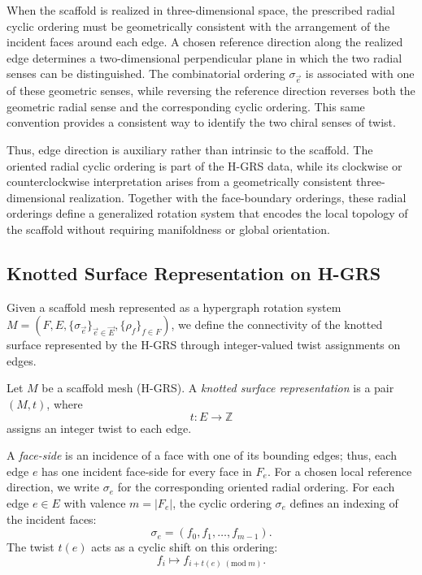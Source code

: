 \documentclass[acmtog]{acmart}
\begin{document}

When the scaffold is realized in three-dimensional space, the prescribed radial cyclic ordering must be geometrically consistent with the arrangement of the incident faces around each edge. A chosen reference direction along the realized edge determines a two-dimensional perpendicular plane in which the two radial senses can be distinguished. The combinatorial ordering $\sigma_{\vec{e}}$ is associated with one of these geometric senses, while reversing the reference direction reverses both the geometric radial sense and the corresponding cyclic ordering. This same convention provides a consistent way to identify the two chiral senses of twist.

Thus, edge direction is auxiliary rather than intrinsic to the scaffold. The oriented radial cyclic ordering is part of the H-GRS data, while its clockwise or counterclockwise interpretation arises from a geometrically consistent three-dimensional realization. Together with the face-boundary orderings, these radial orderings define a generalized rotation system that encodes the local topology of the scaffold without requiring manifoldness or global orientation.

\subsection{Knotted Surface Representation on H-GRS}

Given a scaffold mesh represented as a hypergraph rotation system
$M = (F,E,\{\sigma_{\vec e}\}_{\vec e\in \vec E},\{\rho_f\}_{f\in F})$, we define the connectivity of the knotted surface represented by the H-GRS through integer-valued twist assignments on edges.

\begin{definition}
Let $M$ be a scaffold mesh (H-GRS). A \emph{knotted surface representation}
is a pair $(M, t)$, where
\[
t : E \to \mathbb{Z}
\]
assigns an integer twist to each edge.
\end{definition}

A \emph{face-side} is an incidence of a face with one of its bounding edges; thus, each edge $e$ has one incident face-side for every face in $F_e$. For a chosen local reference direction, we write $\sigma_e$ for the corresponding oriented radial ordering. For each edge $e \in E$ with valence $m = |F_e|$, the cyclic ordering $\sigma_e$ defines an indexing of the incident faces:
\[
\sigma_e = (f_0, f_1, \ldots, f_{m-1}).
\]
The twist $t(e)$ acts as a cyclic shift on this ordering:
\[
f_i \mapsto f_{i + t(e) \; (\mathrm{mod}\; m)}.
\]
\end{document}
